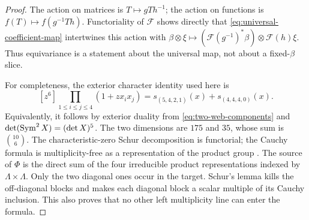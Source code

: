 \begin{proof}
The action on matrices is \(T\mapsto gTh^{-1}\); the action on
functions is \(f(T)\mapsto f(g^{-1}Th)\).  Functoriality of
\(\mathcal F\) shows directly that \eqref{eq:universal-coefficient-map}
intertwines this action with
\(\beta\otimes\xi\mapsto(\mathcal F(g^{-1})^*\beta)
\otimes\mathcal F(h)\xi\).  Thus equivariance is a statement about
the universal map, not about a fixed-\(\beta\) slice.

For completeness, the exterior character identity used here is
\[
 [z^6]\prod_{1\le i\le j\le4}(1+zx_ix_j)
       =s_{(5,4,2,1)}(x)+s_{(4,4,4,0)}(x).
\]
Equivalently, it follows by exterior duality from
\eqref{eq:two-web-components} and
\(\det(\operatorname{Sym}^2X)=(\det X)^5\).  The two dimensions are
\(175\) and \(35\), whose sum is \(\binom{10}{6}\).
The characteristic-zero Schur decomposition is functorial; the
Cauchy formula is multiplicity-free as a representation of the
product group \cite{FultonHarris,DCEP}.  The source of \(\Phi\)
is the direct sum of the four irreducible product representations
indexed by \(\Lambda\times\Lambda\).  Only the two diagonal
ones occur in the target.  Schur's lemma kills the off-diagonal
blocks and makes each diagonal block a scalar multiple of its
Cauchy inclusion.  This also proves that no other left multiplicity
line can enter the formula.


\end{proof}
